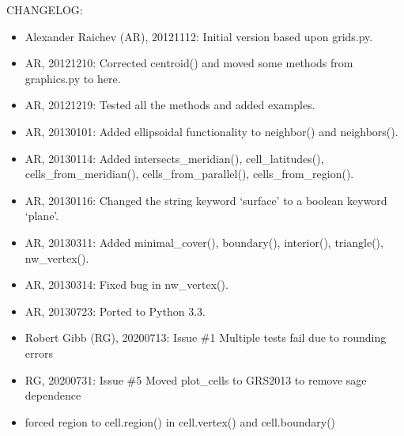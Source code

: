 \documentclass[a4paper,12ptopenany,oneside,english]{sphinxmanual}
\begin{document}
\sphinxAtStartPar
CHANGELOG:
\begin{itemize}
\item {} 
\sphinxAtStartPar
Alexander Raichev (AR), 2012\sphinxhyphen{}11\sphinxhyphen{}12: Initial version based upon grids.py.

\item {} 
\sphinxAtStartPar
AR, 2012\sphinxhyphen{}12\sphinxhyphen{}10: Corrected centroid() and moved some methods from graphics.py to here.

\item {} 
\sphinxAtStartPar
AR, 2012\sphinxhyphen{}12\sphinxhyphen{}19: Tested all the methods and added examples.

\item {} 
\sphinxAtStartPar
AR, 2013\sphinxhyphen{}01\sphinxhyphen{}01: Added ellipsoidal functionality to neighbor() and neighbors().

\item {} 
\sphinxAtStartPar
AR, 2013\sphinxhyphen{}01\sphinxhyphen{}14: Added intersects\_meridian(), cell\_latitudes(), cells\_from\_meridian(), cells\_from\_parallel(), cells\_from\_region().

\item {} 
\sphinxAtStartPar
AR, 2013\sphinxhyphen{}01\sphinxhyphen{}16: Changed the string keyword ‘surface’ to a boolean keyword ‘plane’.

\item {} 
\sphinxAtStartPar
AR, 2013\sphinxhyphen{}03\sphinxhyphen{}11: Added minimal\_cover(), boundary(), interior(), triangle(), nw\_vertex().

\item {} 
\sphinxAtStartPar
AR, 2013\sphinxhyphen{}03\sphinxhyphen{}14: Fixed bug in nw\_vertex().

\item {} 
\sphinxAtStartPar
AR, 2013\sphinxhyphen{}07\sphinxhyphen{}23: Ported to Python 3.3.

\item {} 
\sphinxAtStartPar
Robert Gibb (RG), 2020\sphinxhyphen{}07\sphinxhyphen{}13: Issue \#1 Multiple tests fail due to rounding errors

\item {} 
\sphinxAtStartPar
RG, 2020\sphinxhyphen{}07\sphinxhyphen{}31: Issue \#5 Moved plot\_cells to GRS2013 to remove sage dependence

\item {} \begin{description}
\sphinxAtStartPar
forced region to cell.region() in cell.vertex() and cell.boundary()

\end{description}

\end{itemize}
\end{document}
